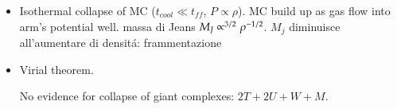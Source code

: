 \begin{itemize}
\item Isothermal collapse of MC ($t_{cool}\ll t_{ff}$, $P\propto\rho$). MC build up as gas flow into arm's potential well. massa di Jeans $M_J\propto^{3/2}\rho^{-1/2}$. $M_j$ diminuisce all'aumentare di densit\'a: frammentazione
\item Virial theorem.






No evidence for collapse of giant complexes: $2T+2U+W+M$.





\end{itemize}
